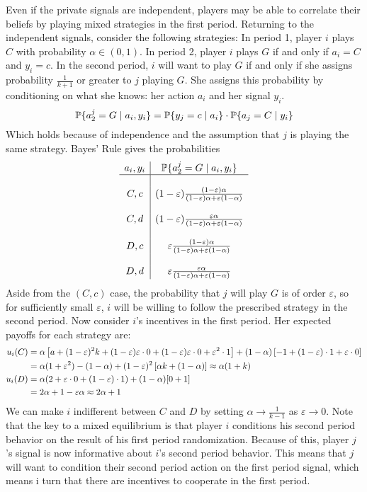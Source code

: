 \documentclass[10pt]{article}
\begin{document}
\begin{remark}
	Even if the private signals are independent, players may be able to correlate their beliefs by playing mixed strategies in the first period. Returning to the independent signals, consider the following strategies: In period 1, player $i$ plays $C$ with probability $\alpha \in (0,1)$. In period 2, player $i$ plays $G$ if and only if $a_i = C$ and $y_i = c$. In the second period, $i$ will want to play $G$ if and only if she assigns probability $\frac{1}{k+1}$ or greater to $j$ playing $G$. She assigns this probability by conditioning on what she knows: her action $a_i$ and her signal $y_i$. \[\mathbb{P}\{a_2^j = G \mid a_i,y_i\} = \mathbb{P}\{y_j = c \mid a_i\} \cdot \mathbb{P}\{a_j = C \mid y_i\}\]Which holds because of independence and the assumption that $j$ is playing the same strategy. Bayes' Rule gives the probabilities \[ \begin{array}{c|c} a_i,y_i & \mathbb{P}\{a_2^j = G \mid a_i,y_i\} \\\hline \\ C,c & (1-\varepsilon) \frac{(1-\varepsilon)\alpha}{(1-\varepsilon)\alpha + \varepsilon(1-\alpha)} \\\\ C,d & (1-\varepsilon) \frac{\varepsilon\alpha}{(1-\varepsilon)\alpha + \varepsilon(1-\alpha)} \\\\ D,c & \varepsilon \frac{(1-\varepsilon)\alpha}{(1-\varepsilon)\alpha + \varepsilon(1-\alpha)} \\\\ D,d & \varepsilon \frac{\varepsilon\alpha}{(1-\varepsilon)\alpha + \varepsilon(1-\alpha)} \end{array}\]Aside from the $(C,c)$ case, the probability that $j$ will play $G$ is of order $\varepsilon$, so for sufficiently small $\varepsilon$, $i$ will be willing to follow the prescribed strategy in the second period. Now consider $i$'s incentives in the first period. Her expected payoffs for each strategy are: \begin{align*} u_i(C) &= \alpha \left[ a + (1-\varepsilon)^2 k + (1-\varepsilon)\varepsilon \cdot 0 + (1-\varepsilon)\varepsilon \cdot 0 + \varepsilon^2 \cdot 1\right] + (1-\alpha)\left[ -1 + (1-\varepsilon) \cdot 1 + \varepsilon\cdot 0\right] \\ &= \alpha (1+\varepsilon^2) - (1-\alpha) + (1-\varepsilon)^2 \left[ \alpha k + (1-\alpha)\right] \approx \alpha (1+k) \\ u_i(D) &= \alpha (2 + \varepsilon \cdot 0 + (1-\varepsilon) \cdot 1) + (1-\alpha) [0 + 1] \\ &= 2\alpha + 1 - \varepsilon\alpha \approx 2\alpha + 1\end{align*}We can make $i$ indifferent between $C$ and $D$ by setting $\alpha \to \frac{1}{k-1}$ as $\varepsilon \to 0$. Note that the key to a mixed equilibrium is that player $i$ conditions his second period behavior on the result of his first period randomization. Because of this, player $j$'s signal is now informative about $i$'s second period behavior. This means that $j$ will want to condition their second period action on the first period signal, which means i turn that there are incentives to cooperate in the first period. 

\end{remark}
\end{document}
